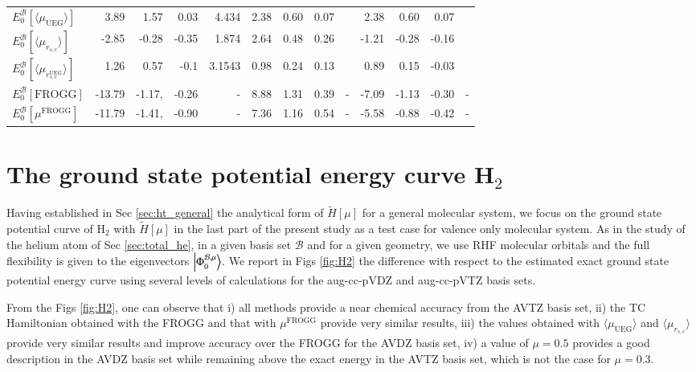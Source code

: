 \documentclass[aip,jcp,reprint,noshowkeys,superscriptaddress]{revtex4-1}
\newcommand{\frogg}[0]{\text{FROGG}}
\newcommand{\mfrogg}[0]{\mu^\text{FROGG}}
\newcommand{\phimub}[0]{\Phi^{\mathcal{B},\mu}_0}
\newcommand{\basis}[0]{\mathcal{B}}
\newcommand{\muuegav}{\langle \mu_{\text{UEG}}\rangle}
\newcommand{\murscav}{\langle \mu_{r_{s,c}}\rangle}
\newcommand{\mursclda}{\langle \mu_{r_{s,c}^{\text{UEG}}}\rangle}
\begin{document}
\begin{table}
\begin{ruledtabular}
\begin{tabular}{l|rrr|r||rrr|r||rrr|r|}
$E_0^{\basis}[\muuegav]$ &  3.89   &   1.57   &  0.03    &4.434      & 2.38    &    0.60  &    0.07 &          &   2.38   &   0.60   &    0.07&      \\   
$E_0^{\basis}[\murscav]$ &  -2.85  &  -0.28   & -0.35    &1.874      & 2.64    &    0.48  &    0.26 &          &  -1.21   &  -0.28   &   -0.16&      \\   
$E_0^{\basis}[\mursclda]$&  1.26   &   0.57   & -0.1     &3.1543     & 0.98    &    0.24  &    0.13 &          &   0.89   &   0.15   &   -0.03&      \\   
$E_0^{\basis}[\frogg]$   &  -13.79 &  -1.17,  & -0.26    &    -      & 8.88    &    1.31  &    0.39 &   -      & -7.09    &  -1.13   &   -0.30&    - \\
$E_0^{\basis}[\mfrogg]$  &  -11.79 &  -1.41,  & -0.90    &    -      & 7.36    &    1.16  &    0.54 &   -      & -5.58    &  -0.88   &   -0.42&    - \\
\end{tabular}
\end{ruledtabular}
\end{table}

\section{The ground state potential energy curve H$_2$}
Having established in Sec \ref{sec:ht_general} the analytical form of $ \tilde{H}[\mu]$ for a general molecular system, we focus on the ground state potential curve of H$_2$ with $ \tilde{H}[\mu]$ in the last part of the present study as a test case for valence only molecular system. 
As in the study of the helium atom of Sec \ref{sec:total_he}, in a given basis set $\basis$ and for a given geometry, we use RHF molecular orbitals and the full flexibility is given to the eigenvectors $\ket{\phimub}$. 
We report in Figs \ref{fig:H2} the difference with respect to the estimated exact ground state potential energy curve using several levels of calculations for the aug-cc-pVDZ and aug-cc-pVTZ basis sets. 

From the Figs \ref{fig:H2}, one can observe that i) all methods provide a near chemical accuracy from the AVTZ basis set, ii) the TC Hamiltonian obtained with the FROGG and that with $\mfrogg$ provide very similar results, iii) the values obtained with $\muuegav$ and $\murscav$ provide very similar results and improve accuracy over the FROGG for the AVDZ basis set, iv) a value of $\mu = 0.5$ provides a good description in the AVDZ basis set while remaining above the exact energy in the AVTZ basis set, which is not the case for $\mu=0.3$. 
\end{document}
